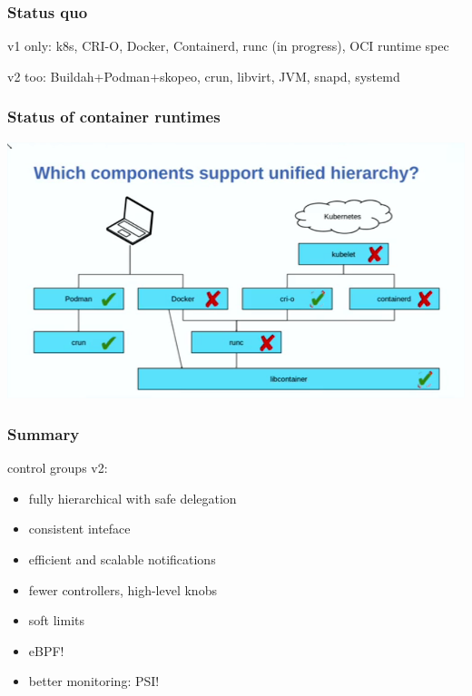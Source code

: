 \documentclass[serif]{beamer}
\begin{document}
\begin{frame}
  \frametitle{Status quo}

  v1 only: k8s, CRI-O, Docker, Containerd, runc (in progress), OCI runtime spec

  \medskip

  v2 too: Buildah+Podman+skopeo, crun, libvirt, JVM, snapd, systemd
\end{frame}



\begin{frame}
  \frametitle{Status of container runtimes}

  \includegraphics[width=\textwidth]{images/container-runtime-status.png}
\end{frame}


\begin{frame}
  \frametitle{Summary}

  control groups v2:
  \begin{itemize}
  \item fully hierarchical with safe delegation
  \item consistent inteface
  \item efficient and scalable notifications
  \item fewer controllers, high-level knobs
  \item soft limits
  \item eBPF!
  \item better monitoring: PSI!
  \end{itemize}
\end{frame}
\end{document}
